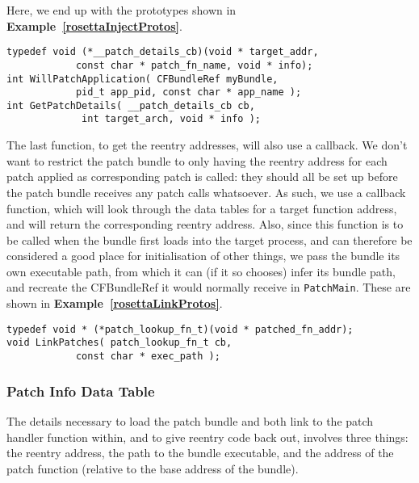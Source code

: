 \documentclass[english]{article}
\begin{document}
Here, we end up with the prototypes shown in \textbf{Example~\ref{rosettaInjectProtos}}.

\begin{lstlisting}[label= rosettaInjectProtos, caption=Rosetta entry point prototypes.]
typedef void (*__patch_details_cb)(void * target_addr, 
            const char * patch_fn_name, void * info);
int WillPatchApplication( CFBundleRef myBundle, 
            pid_t app_pid, const char * app_name );
int GetPatchDetails( __patch_details_cb cb,
             int target_arch, void * info );
\end{lstlisting}

The last function, to get the reentry addresses, will also use a callback. We don't want to restrict the patch bundle to only having the reentry address for each patch applied as corresponding patch is called: they should all be set up before the patch bundle receives any patch calls whatsoever. As such, we use a callback function, which will look through the data tables for a target function address, and will return the corresponding reentry address. Also, since this function is to be called when the bundle first loads into the target process, and can therefore be considered a good place for initialisation of other things, we pass the bundle its own executable path, from which it can (if it so chooses) infer its bundle path, and recreate the CFBundleRef it would normally receive in \texttt{PatchMain}. These are shown in \textbf{Example~\ref{rosettaLinkProtos}}.

\begin{lstlisting}[label= rosettaLinkProtos, caption=Rosetta linkage functions]
typedef void * (*patch_lookup_fn_t)(void * patched_fn_addr);
void LinkPatches( patch_lookup_fn_t cb, 
            const char * exec_path );
\end{lstlisting}

\subsubsection{Patch Info Data Table}
The details necessary to load the patch bundle and both link to the patch handler function within, and to give reentry code back out, involves three things: the reentry address, the path to the bundle executable, and the address of the patch function (relative to the base address of the bundle).
\end{document}
